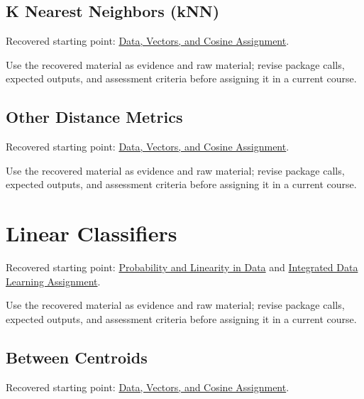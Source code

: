 \documentclass[
  letterpaper,
]{scrbook}
\begin{document}
\subsection*{K Nearest Neighbors
(kNN)}\label{sec-pr-07-k-nearest-neighbors-knn}

Recovered starting point:
\hyperref[sec-lab-data-initialization-assignment]{Data, Vectors, and
Cosine Assignment}.

Use the recovered material as evidence and raw material; revise package
calls, expected outputs, and assessment criteria before assigning it in
a current course.

\subsection*{Other Distance
Metrics}\label{sec-pr-07-other-distance-metrics}

Recovered starting point:
\hyperref[sec-lab-data-initialization-assignment]{Data, Vectors, and
Cosine Assignment}.

Use the recovered material as evidence and raw material; revise package
calls, expected outputs, and assessment criteria before assigning it in
a current course.

\section*{Linear Classifiers}\label{sec-pr-07-linear-classifiers}


Recovered starting point:
\hyperref[sec-lab-probability-linearity]{Probability and Linearity in
Data} and \hyperref[sec-lab-integrated-learning-assignment]{Integrated
Data Learning Assignment}.

Use the recovered material as evidence and raw material; revise package
calls, expected outputs, and assessment criteria before assigning it in
a current course.

\subsection*{Between Centroids}\label{sec-pr-07-between-centroids}

Recovered starting point:
\hyperref[sec-lab-data-initialization-assignment]{Data, Vectors, and
Cosine Assignment}.
\end{document}
